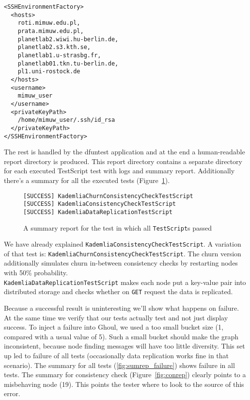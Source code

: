 \begin{verbatim}
<SSHEnvironmentFactory>
  <hosts>
    roti.mimuw.edu.pl,
    prata.mimuw.edu.pl,
    planetlab2.wiwi.hu-berlin.de,
    planetlab2.s3.kth.se,
    planetlab1.u-strasbg.fr,
    planetlab01.tkn.tu-berlin.de,
    pl1.uni-rostock.de
  </hosts>
  <username>
    mimuw_user
  </username>
  <privateKeyPath>
    /home/mimuw_user/.ssh/id_rsa
  </privateKeyPath>
</SSHEnvironmentFactory>
\end{verbatim}

The rest is handled by the dfuntest application and at the end a human-readable
report directory is produced. This report directory contains a separate
directory for each executed TestScript test with logs and summary report.
Additionally there's a summary for all the executed tests
(Figure~\ref{fig:sumrep}).

\begin{figure}[tbp]
\begin{verbatim}
[SUCCESS] KademliaChurnConsistencyCheckTestScript
[SUCCESS] KademliaConsistencyCheckTestScript
[SUCCESS] KademliaDataReplicationTestScript
\end{verbatim}
\caption{A summary report for the test in which all \texttt{TestScript}s passed}
\label{fig:sumrep}
\end{figure}

We have already explained \texttt{KademliaConsistencyCheckTestScript}.
A variation of that test is:
\texttt{KademliaChurnConsistencyCheckTestScript}.
The churn version additionally simulates churn in-between consistency checks by
restarting nodes with 50\% probability.\\
\texttt{KademliaDataReplicationTestScript} makes each node put a key-value pair
into distributed storage and checks whether on \texttt{GET} request the data is
replicated.

Because a successful result is uninteresting we'll show what happens on failure.
At the same time we verify that our tests actually test and not just display
success.
To inject a failure into Ghoul, we used a too small bucket size (1, compared
with a usual value of 5).
Such a small bucket should make the graph inconsistent, because node finding
messages will have too little diversity.
This set up led to failure of all tests (occasionally data replication works
fine in that scenario).
The summary for all tests (\ref{fig:sumrep_failure}) shows failure in all
tests.
The summary for consistency check (Figure~\ref{fig:conrep}) clearly points to a
misbehaving node (19).
This points the tester where to look to the source of this error.

